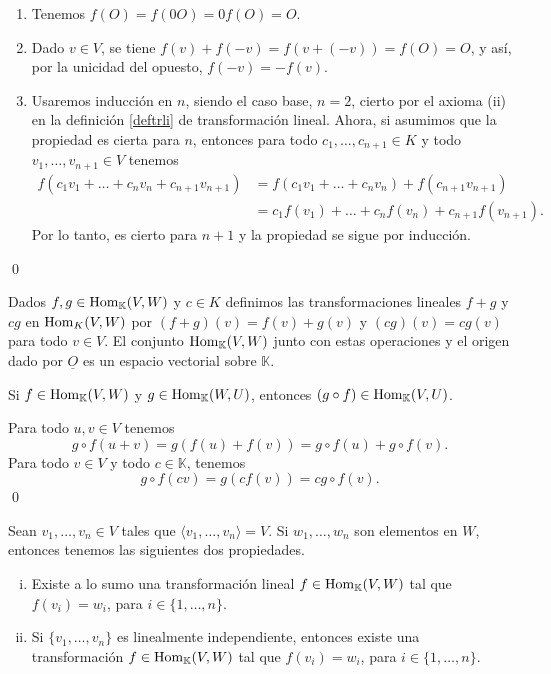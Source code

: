 \dem 
\begin{enumerate}
\item Tenemos $f(O)=f(0O)=0f(O)=O$.
\item Dado $v\in V$, se tiene $f(v)+f(-v)=f\left(v+(-v)\right)=f(O)=O$, y as\'i, por la unicidad del opuesto, $f(-v)=-f(v)$.
\item Usaremos inducci\'on en $n$, siendo el caso base, $n=2$, cierto por el axioma (ii) en la definici\'on \ref{deftrli} de transformaci\'on lineal. Ahora, si asumimos que la propiedad es cierta para $n$, entonces para todo $c_1,\ldots,c_{n+1}\in K$ y todo $v_1,\ldots,v_{n+1}\in V$ tenemos
\begin{align*}
f(c_1v_1+\ldots+c_nv_n+c_{n+1}v_{n+1})& = f(c_1v_1+\ldots+c_nv_n)+f(c_{n+1}v_{n+1})\\
  & = c_1f(v_1)+\ldots+c_nf(v_n)+c_{n+1}f(v_{n+1}).
\end{align*}
Por lo tanto, es cierto para $n+1$ y la propiedad se sigue por inducci\'on.
\end{enumerate}\qed

\begin{obs}
Dados $f,g\in\operatorname{Hom}_{\mathbb{K}}(V,W)$ y $c\in K$ definimos las transformaciones lineales $f+g$ y $cg$ en $\operatorname{Hom}_K(V,W)$ por $(f+g)(v)=f(v)+g(v)$ y $(cg)(v) = cg(v)$ para todo $v\in V$. El conjunto $\operatorname{Hom}_{\mathbb{K}}(V,W)$ junto con estas operaciones y el origen dado por $\underline{O}$ es un espacio vectorial sobre $\mathbb{K}$.
\end{obs}

\begin{prop}\label{compeslineal}
Si $f\in\operatorname{Hom}_{\mathbb{K}}(V,W)$ y $g\in\operatorname{Hom}_{\mathbb{K}}(W,U)$, entonces $(g\circ f)\in\operatorname{Hom}_{\mathbb{K}}(V,U)$.
\end{prop}

\dem Para todo $u,v\in V$ tenemos
\[
g\circ f(u+v)=g\left( f(u)+f(v)\right)= g\circ f(u)+g\circ f(v).
\]
Para todo $v\in V$ y todo $c\in \mathbb{K}$, tenemos
\[
g\circ f(cv)=g\left( c f(v)\right)=cg\circ f(v).
\]
\qed

\begin{prop}\label{unitrlin}
Sean $v_1,\ldots,v_n\in V$ tales que $\langle v_1,\ldots,v_n\rangle=V$. Si $w_1,\ldots,w_n$ son elementos en $W$, entonces tenemos las siguientes dos propiedades.
\begin{enumerate}[(i)]
\item Existe a lo sumo una transformaci\'on lineal $f\in\operatorname{Hom}_{\mathbb{K}}(V,W)$ tal que $f(v_i)=w_i$, para $i\in\{1,\ldots,n\}$.
\item Si $\{v_1,\ldots,v_n\}$ es linealmente independiente, entonces existe una transformaci\'on $f\in\operatorname{Hom}_{\mathbb{K}}(V,W)$ tal que $f(v_i)=w_i$, para $i\in\{1,\ldots,n\}$.
\end{enumerate}
\end{prop}

